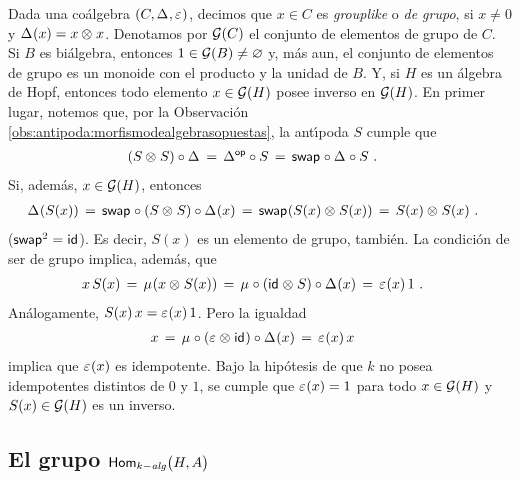 \begin{obsElementosDeGrupo}\label{obs:elementosdegrupo}
	Dada una co\'{a}lgebra $(C,\Delta_{},\varepsilon_{})$, decimos que
	$x\in C$ es \emph{grouplike} o \emph{de grupo}, si $x\not=0$ y
	$\Delta_{}(x)=x\otimes_{} x$. Denotamos por $\mathcal G(C)$ el conjunto
	de elementos de grupo de $C$. Si $B$ es bi\'{a}lgebra, entonces
	$1\in\mathcal G(B)\not=\varnothing$ y, m\'{a}s aun, el conjunto de
	elementos de grupo es un monoide con el producto y la unidad de $B$. Y,
	si $H$ es un \'{a}lgebra de Hopf, entonces todo elemento
	$x\in\mathcal G(H)$ posee inverso en $\mathcal G(H)$. En primer lugar,
	notemos que, por la Observaci\'{o}n~%
	\ref{obs:antipoda:morfismodealgebrasopuestas}, la ant\'{\i}poda
	$S$ cumple que
	\begin{align*}
		(S\otimes_{} S)\circ\Delta_{} & \,=\,\Delta_{}^{\mathsf{op}}\circ S
			\,=\, \mathsf{swap}_{}\circ\Delta_{}\circ S
		\text{ .}
	\end{align*}
	Si, adem\'{a}s, $x\in\mathcal G(H)$, entonces
	\begin{align*}
		\Delta_{}(S(x)) & \,=\,
			\mathsf{swap}_{}\circ (S\otimes_{} S)\circ\Delta_{}(x) \,=\,
			\mathsf{swap}_{} (S(x)\otimes_{} S(x))\,=\,S(x)\otimes_{} S(x)
		\text{ .}
	\end{align*}
	($\mathsf{swap}_{}^2=\mathsf{id}_{}$). Es decir, $S(x)$ es un elemento de grupo, tambi\'{e}n.
	La condici\'{o}n de ser de grupo implica, adem\'{a}s, que
	\begin{align*}
		x\,S(x) & \,=\,\mu_{}(x\otimes_{} S(x))\,=\,
			\mu_{}\circ(\mathsf{id}_{}\otimes_{} S)\circ\Delta_{}(x)\,=\,
			\varepsilon_{}(x)\,1
		\text{ .}
	\end{align*}
	An\'{a}logamente, $S(x)\,x=\varepsilon_{}(x)\,1$. Pero la igualdad
	\begin{align*}
		x & \,=\,\mu_{}\circ(\varepsilon_{}\otimes_{}\mathsf{id}_{})\circ\Delta_{}(x)
			\,=\,\varepsilon_{}(x)\,x
	\end{align*}
	implica que $\varepsilon_{}(x)$ es idempotente. Bajo la hip\'{o}tesis de que
	$k$ no posea idempotentes distintos de $0$ y $1$, se cumple que
	$\varepsilon_{}(x)=1$ para todo $x\in\mathcal G(H)$ y $S(x)\in\mathcal G(H)$
	es un inverso.
\end{obsElementosDeGrupo}

\subsection{El grupo $\mathsf{Hom}_{k-\mathit{alg}}\big(H,A\big)$}\label{subsec:hopf:elgrupo}

